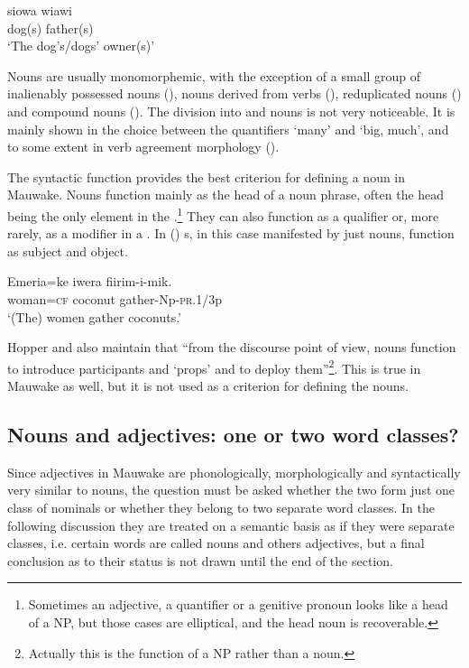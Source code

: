 \ea%
\label{ex:x1}
\gll siowa wiawi\\
dog(s) father(s)\\
\glt`The dog's/dogs' owner(s)'
\z

Nouns are usually monomorphemic, with the exception of a small group of inalienably possessed nouns (), nouns derived from verbs (), reduplicated nouns () and compound nouns (). The division into  and  nouns is not very noticeable. It is mainly shown in the choice between the quantifiers  `many' and  `big, much', and to some extent in verb agreement morphology ().

The syntactic function provides the best criterion for defining a noun in Mauwake. Nouns function mainly as the head of a noun phrase, often the head being the only element in the .\footnote{Sometimes an adjective, a quantifier or a genitive pronoun looks like a head of a NP, but those cases are elliptical, and the head noun is recoverable.} They can also function as a qualifier or, more rarely, as a modifier in a . In () s, in this case manifested by just nouns, function as subject and object.

\ea%
\label{ex:x2}
\gll Emeria=ke iwera fiirim-i-mik.\\
 woman=\textsc{cf} coconut gather-Np-\textsc{pr}.1/3p\\
\glt`(The) women gather coconuts.'
\z

Hopper and \citet[710]{Thompson1984} also maintain that {``from the discourse point of view, nouns function to introduce participants and `props' and to deploy them''}\footnote{Actually this is the function of a NP rather than a noun.}{.} This is true in Mauwake as well, but it is not used as a criterion for defining the nouns.

\subsection{Nouns and adjectives: one or two word classes?}
{}
Since adjectives in Mauwake are phonologically, morphologically and syntactically very similar to nouns, the question must be asked whether the two form just one class of nominals or whether they belong to two separate word classes. In the following discussion they are treated on a semantic basis as if they were separate classes, i.e. certain words are called nouns and others adjectives, but a final conclusion as to their status is not drawn until the end of the section.

